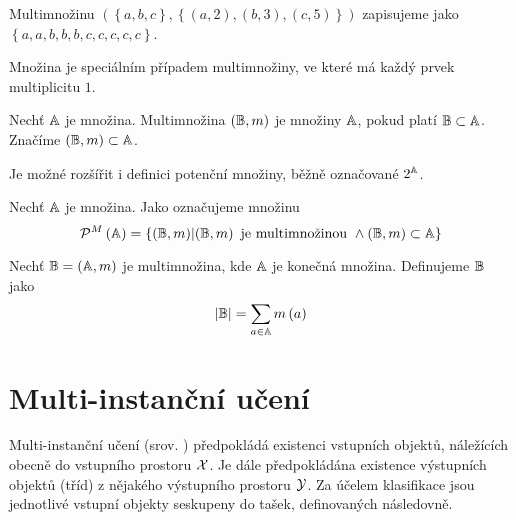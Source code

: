 \begin{example}
	Multimnožinu \( \left( \left\{ a, b, c \right\}, \left\{ \left( a, 2 \right), \left( b, 3 \right), \left( c, 5 \right) \right\} \right) \) zapisujeme jako \( \left\{ a, a, b, b, b, c, c, c, c, c \right\} \).
\end{example}

\begin{remark}
	Množina je speciálním případem multimnožiny, ve které má každý prvek multiplicitu \( 1 \).
\end{remark}

\begin{define}
	Nechť \( \mathbb A \) je množina. Multimnožina \( \left( \mathbb B, m \right) \) je  množiny \( \mathbb A \), pokud platí \( \mathbb B \subset \mathbb A \). Značíme \( \left( \mathbb B, m \right) \subset \mathbb A \).
\end{define}

Je možné rozšířit i definici potenční množiny, běžně označované \( 2^{\mathbb A} \).

\begin{define}
	Nechť \( \mathbb A \) je množina. Jako  označujeme množinu
	\[ \mathcal P^M \left( \mathbb A \right) = \left\{ \left( \mathbb B, m \right) \middle| \left( \mathbb B, m \right) \text{ je multimnožinou } \land \left( \mathbb B, m \right) \subset \mathbb A \right\} \]
\end{define}

\begin{define}
	Nechť \( \mathbb B = \left( \mathbb A, m \right) \) je multimnožina, kde \( \mathbb A \) je konečná množina. Definujeme  \( \mathbb B \) jako
	\[ \left| \mathbb B \right| = \sum_{a \in \mathbb A} m \left( a \right) \]
\end{define}

\section{Multi-instanční učení}

Multi-instanční učení (srov. \cite{dietterich_solving_1997}) předpokládá existenci vstupních objektů, náležících obecně do vstupního prostoru \( \mathcal X \). Je dále předpokládána existence výstupních objektů (tříd) z nějakého výstupního prostoru \( \mathcal Y \). Za účelem klasifikace jsou jednotlivé vstupní objekty seskupeny do tašek, definovaných následovně.

